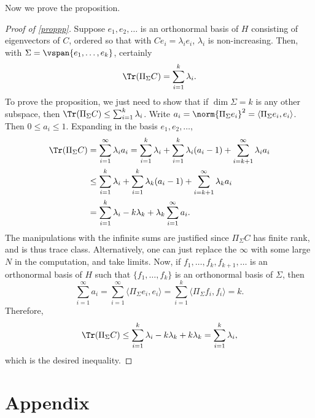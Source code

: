 \documentclass[12pt]{amsart}
\begin{document}
Now we prove the proposition.
\begin{proof}[Proof of \cref{proppp}]
Suppose $e_1,e_2,\ldots$ is an orthonormal basis of $H$ consisting of eigenvectors of $C$, ordered so that with $Ce_i = \lambda_ie_i$, $\lambda_i$ is non-increasing. Then, with $\Sigma = \vspan\{e_1,\ldots,e_k\}$, certainly
\[\Tr(\Pi_\Sigma C) = \sum_{i=1}^k \lambda_i.\] To prove the proposition, we just need to show that if $\dim \Sigma = k$ is any other subspace, then $\Tr(\Pi_\Sigma C) \leq \sum_{i=1}^k \lambda_i$. Write $a_i = \norm{\Pi_\Sigma e_i}^2 = \langle \Pi_\Sigma e_i,e_i\rangle$. Then $0 \leq a_i \leq 1$. Expanding in the basis $e_1,e_2,\ldots$,
\begin{align*}
\Tr(\Pi_\Sigma C) &= \sum_{i=1}^{\infty} \lambda_ia_i = \sum_{i=1}^k \lambda_i + \sum_{i=1}^k\lambda_i (a_i-1) + \sum_{i={k+1}}^{\infty}\lambda_i a_i\\
&\leq \sum_{i=1}^k \lambda_i + \sum_{i=1}^k\lambda_k(a_i-1) + \sum_{i={k+1}}^{\infty}\lambda_k a_i\\
&= \sum_{i=1}^k \lambda_i  -k\lambda_k +  \lambda_k\sum_{i=1}^{\infty}a_i.\end{align*}
The manipulations with the infinite sums are justified since $\Pi_\Sigma C$ has finite rank, and is thus trace class. Alternatively, one can just replace the $\infty$ with some large $N$ in the computation, and take limits. Now, if $f_1,\ldots,f_k,f_{k+1},\ldots$ is an orthonormal basis of $H$ such that $\{f_1,\ldots,f_k\}$ is an orthonormal basis of $\Sigma$, then
\[\sum_{i=1}^{\infty} a_i = \sum_{i=1}^{\infty} \langle \Pi_\Sigma e_i,e_i\rangle = \sum_{i=1}^{k} \langle \Pi_\Sigma f_i,f_i\rangle = k.\]
Therefore,
\[\Tr(\Pi_\Sigma C) \leq \sum_{i=1}^k \lambda_i  -k\lambda_k + k\lambda_k = \sum_{i=1}^k \lambda_i,\] which is the desired inequality.
\end{proof}

\appendix
\section{Appendix}
\end{document}
